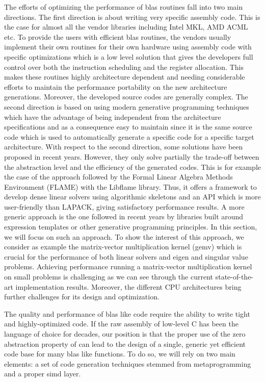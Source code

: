 \documentclass[../main]{subfiles}
\begin{document}
The efforts of optimizing the performance of \gls{blas} routines
fall into two main directions. The first direction is about
writing very specific assembly code. This is the case for
almost all the vendor libraries including Intel MKL\cite{hpcs1},
AMD ACML\cite{hpcs2} etc. To provide the users with efficient \gls{blas}
routines, the vendors usually implement their own routines
for their own hardware using assembly code with specific
optimizations which is a low level solution that gives the
developers full control over both the instruction scheduling
and the register allocation. This makes these routines highly
architecture dependent and needing considerable efforts to
maintain the performance portability on the new architecture
generations. Moreover, the developed source codes are generally
complex. The second direction is based on using modern
generative programming techniques which have the advantage
of being independent from the architecture specifications and
as a consequence easy to maintain since it is the same source
code which is used to automatically generate a specific code
for a specific target architecture. With respect to the second
direction, some solutions have been proposed in recent years.
However, they only solve partially the trade-off between the
abstraction level and the efficiency of the generated codes.
This is for example the case of the approach followed by
the Formal Linear Algebra Methods Environment (FLAME)
with the Libflame library\cite{hpcs3}. Thus, it offers a framework to
develop dense linear solvers using algorithmic skeletons\cite{hpcs4}
and an API which is more user-friendly than LAPACK, giving
satisfactory performance results. A more generic approach is
the one followed in recent years by \cpp libraries built around
expression templates\cite{hpcs5} or other generative programming\cite{hpcs6}
principles. In this section, we will focus on such an approach.
To show the interest of this approach, we consider as
example the matrix-vector multiplication kernel (gemv) which
is crucial for the performance of both linear solvers and eigen
and singular value problems. Achieving performance running
a matrix-vector multiplication kernel on small problems is
challenging as we can see through the current state-of-the-art
implementation results. Moreover, the different CPU architectures
bring further challenges for its design and optimization.

The quality and performance of \gls{blas} like code require
the ability to write tight and highly-optimized code. If the
raw assembly of low-level C has been the language of choice
for decades, our position is that the proper use of the zero abstraction
property of \cpp can lead to the design of a single,
generic yet efficient code base for many \gls{blas} like functions.
To do so, we will rely on two main elements: a set of code generation techniques
stemmed from metaprogramming and a proper \cpp \gls{simd} layer.
\end{document}
